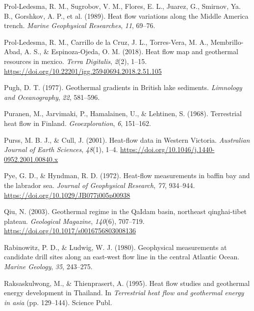 \begin{CSLReferences}{1}{1}
\leavevmode{}%
Prol-Ledesma, R. M., Sugrobov, V. M., Flores, E. L., Juarez, G., Smirnov, Ya. B., Gorshkov, A. P., et al. (1989). Heat flow variations along the {Middle America} trench. \emph{Marine Geophysical Researches}, \emph{11}, 69--76.

\leavevmode{}%
Prol-Ledesma, R. M., Carrillo de la Cruz, J. L., Torres-Vera, M. A., Membrillo-Abad, A. S., \& Espinoza-Ojeda, O. M. (2018). Heat flow map and geothermal resources in mexico. \emph{Terra Digitalis}, \emph{2}(2), 1--15. \url{https://doi.org/10.22201/igg.25940694.2018.2.51.105}

\leavevmode{}%
Pugh, D. T. (1977). Geothermal gradients in {British} lake sediments. \emph{Limnology and Oceanography}, \emph{22}, 581--596.

\leavevmode{}%
Puranen, M., Jarvimaki, P., Hamalainen, U., \& Lehtinen, S. (1968). Terrestrial heat flow in {Finland}. \emph{Geoexploration}, \emph{6}, 151--162.

\leavevmode{}%
Purss, M. B. J., \& Cull, J. (2001). Heat-flow data in {Western Victoria}. \emph{Australian Journal of Earth Sciences}, \emph{48}(1), 1--4. \url{https://doi.org/10.1046/j.1440-0952.2001.00840.x}

\leavevmode{}%
Pye, G. D., \& Hyndman, R. D. (1972). Heat-flow measurements in baffin bay and the labrador sea. \emph{Journal of Geophysical Research}, \emph{77}, 934--944. \url{https://doi.org/10.1029/JB077i005p00938}

\leavevmode{}%
Qiu, N. (2003). Geothermal regime in the QaIdam basin, northeast qinghai-tibet plateau. \emph{Geological Magazine}, \emph{140}(6), 707--719. \url{https://doi.org/10.1017/s0016756803008136}

\leavevmode{}%
Rabinowitz, P. D., \& Ludwig, W. J. (1980). Geophysical measurements at candidate drill sites along an east-west flow line in the central {Atlantic Ocean}. \emph{Marine Geology}, \emph{35}, 243--275.

\leavevmode{}%
Raksaskulwong, M., \& Thienprasert, A. (1995). Heat flow studies and geothermal energy development in {Thailand}. In \emph{Terrestrial heat flow and geothermal energy in asia} (pp. 129--144). Science Publ.


\end{CSLReferences}
